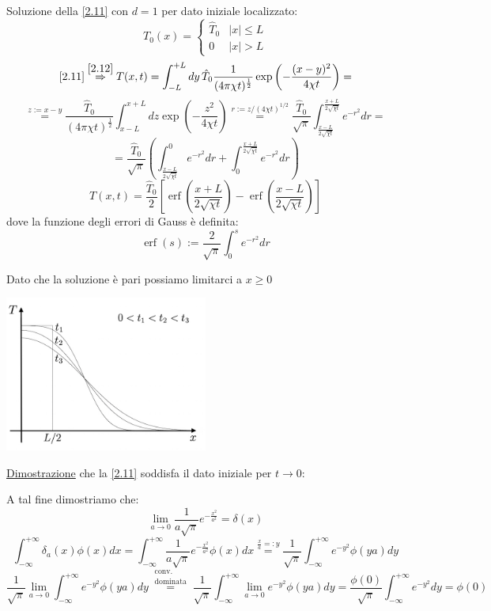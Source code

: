 \documentclass[a4paper,11pt]{report}
\begin{document}
Soluzione della \eqref{2.11} con $d=1$ per dato iniziale localizzato:
\[
T_0(x)=\left\{\begin{matrix}
 \hat{T}_0 & |x|\leq L \\ 
 0 & |x| > L
\end{matrix}\right.
\]
\[
\eqref{2.11}\overset{\eqref{2.12}}{\Rightarrow} T(x,t)=\int_{-L}^{+L}dy \, \hat{T}_0 \frac{1}{(4\pi\chi t)^\frac{1}{2}}\exp{\left(-\frac{(x-y)^2}{4\chi t}\right)}=
\]
\[
\overset{z:=x-y}{=}\frac{\hat{T}_0}{(4\pi\chi t)^\frac{1}{2}}\int_{x-L}^{x+L}dz \exp{\left(-\frac{z^2}{4\chi t}\right)}\overset{r:={z}/{(4\chi t)^{1/2}}}{=}\frac{\hat{T}_0}{\sqrt{\pi}}\int_{\frac{x-L}{2\sqrt{\chi t}}}^{\frac{x+L}{2\sqrt{\chi t}}} e^{-r^2}dr=
\]
\[
=\frac{\hat{T}_0}{\sqrt{\pi}}\left(\int_{\frac{x-L}{2\sqrt{\chi t}}}^{0}e^{-r^2}dr + \int_0^{\frac{x+L}{2\sqrt{\chi t}}}e^{-r^2}dr\right)
\]
\begin{equation}
T(x,t)=\frac{\hat{T}_0}{2}\left[\operatorname{erf}\left(\frac{x+L}{2\sqrt{\chi t}}\right)-\operatorname{erf}\left(\frac{x-L}{2\sqrt{\chi t}}\right)\right]
\end{equation}
dove la funzione degli errori di Gauss \`e definita:
\begin{equation}
\operatorname{erf}(s):=\frac{2}{\sqrt{\pi}}\int_0^s e^{-r^2}dr
\end{equation}

Dato che la soluzione \`e pari possiamo limitarci a $x\geq 0$
\begin{center}
\includegraphics[width=0.5\textwidth]{immagini/calore}
\end{center}

\underline{Dimostrazione} che la \eqref{2.11} soddisfa il dato iniziale per $t\rightarrow 0$:

A tal fine dimostriamo che:
\[
\lim_{a \to 0} \frac{1}{a\sqrt{\pi}}e^{-\frac{x^2}{a^2}}=\delta(x)
\]
\[
\int_{-\infty}^{+\infty}\delta_a(x)\phi(x)dx=\int_{-\infty}^{+\infty}\frac{1}{a\sqrt{\pi}}e^{-\frac{x^2}{a^2}}\phi(x)dx\overset{\frac{x}{a}=:y}{=}\frac{1}{\sqrt{\pi}}\int_{-\infty}^{+\infty}e^{-y^2}\phi(ya)dy
\]
\[
\frac{1}{\sqrt{\pi}}\lim_{a\to 0}\int_{-\infty}^{+\infty}e^{-y^2}\phi(ya)dy\overset{\substack{\text{conv.}\\ \text{dominata}}}{=}
\frac{1}{\sqrt{\pi}}\int_{-\infty}^{+\infty}\lim_{a\to 0}e^{-y^2}\phi(ya)dy=\frac{\phi(0)}{\sqrt{\pi}}\int_{-\infty}^{+\infty}e^{-y^2}dy=\phi(0)
\]
\end{document}
